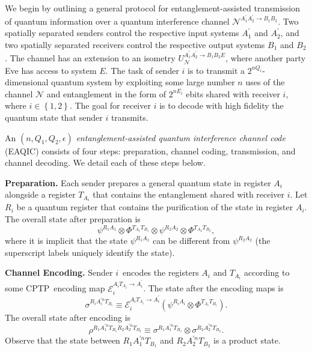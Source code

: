 \documentclass[aps,11pt,twoside,letterpaper]{article}
\begin{document}
				    

		

		We begin by outlining a general protocol for entanglement-assisted
		transmission of quantum information over a quantum interference channel
		$\mathcal{N}^{A_{1}^{\prime}A_{2}^{\prime}\rightarrow B_{1}B_{2}}$. Two
		spatially separated senders control the respective input systems
		$A_{1}^{\prime}$ and $A_{2}^{\prime}$, and two spatially separated receivers
		control the respective output systems $B_{1}$ and $B_{2}$. The channel has an
		extension to an isometry $U_{\mathcal{N}}^{A_{1}^{\prime}A_{2}^{\prime
		}\rightarrow B_{1}B_{2}E}$, where another party Eve has access to system $E$.
		The task of sender $i$ is to transmit a $2^{nQ_{i}}$-dimensional quantum
		system by exploiting some large number $n$ uses of the channel $\mathcal{N}$
		and entanglement in the form of $2^{nE_{i}}$ ebits shared with receiver $i$,
		where $i\in\left\{  1,2\right\}  $. The goal for receiver $i$ is to decode
		with high fidelity the quantum state that sender $i$ transmits.

		An $(n,Q_{1},Q_{2},\epsilon)$ \textit{entanglement-assisted quantum
		interference channel code} (EAQIC) consists of four steps: preparation,
		channel coding, transmission, and channel decoding. We detail each of these
		steps below.

		\textbf{Preparation.} Each sender prepares a general quantum state in register
		$A_{i}$ alongside a register $T_{A_{i}}$ that contains the entanglement shared
		with receiver $i$. Let $R_{i}$ be a quantum register that contains the
		purification of the state in register $A_{i}$. The overall state after
		preparation is%
		\[
		\psi^{R_{1}A_{1}}\otimes\Phi^{T_{A_{1}}T_{B_{1}}}\otimes\psi^{R_{2}A_{2}%
		}\otimes\Phi^{T_{A_{2}}T_{B_{2}}},
		\]
		where it is implicit that the state $\psi^{R_{1}A_{1}}$ can be different from
		$\psi^{R_{2}A_{2}}$ (the superscript labels uniquely identify the state).

		\textbf{Channel Encoding.} Sender $i$\ encodes the registers $A_{i}$ and
		$T_{A_{i}}$ according to some CPTP\ encoding map $\mathcal{E}_{i}%
		^{A_{i}T_{A_{i}}\rightarrow A_{i}^{\prime}}$. The state after the encoding
		maps is%
		\[
		\sigma^{R_{i}A_{i}^{\prime n}T_{B_{i}}}\equiv\mathcal{E}_{i}^{A_{i}T_{A_{i}%
		}\rightarrow A_{i}^{\prime}}(\psi^{R_{i}A_{i}}\otimes\Phi^{T_{A_{i}}T_{B_{i}}%
		}).
		\]
		The overall state after encoding is%
		\[
		\rho^{R_{1}A_{1}^{\prime n}T_{B_{1}}R_{2}A_{2}^{\prime n}T_{B_{2}}}%
		\equiv\sigma^{R_{1}A_{1}^{\prime n}T_{B_{1}}}\otimes\sigma^{R_{2}A_{2}^{\prime
		n}T_{B_{2}}}.
		\]
		Observe that the state between $R_{1}A_{1}^{\prime n}T_{B_{1}}$ and
		$R_{2}A_{2}^{\prime n}T_{B_{2}}$ is a product state.
\end{document}
